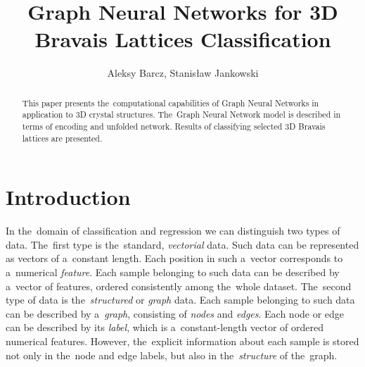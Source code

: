 \documentclass{llncs}
\title{Graph Neural Networks for 3D Bravais Lattices Classification}
\author{Aleksy Barcz, Stanis{\l}aw Jankowski}
\institute{Institute of Electronic Systems, Warsaw University of Technology, Warsaw, Poland}
\begin{document}
\maketitle
%
\begin{abstract}
This paper presents the~computational capabilities of Graph Neural Networks in application to 3D crystal structures. The~Graph Neural Network model is described in terms of encoding and unfolded network. Results of classifying selected 3D Bravais lattices are presented.
\end{abstract}

\section{Introduction}
In the~domain of classification and regression we can distinguish two types of data. The~first type is the~standard, \emph{vectorial} data. Such data can be represented as vectors of a~constant length. Each position in such a~vector corresponds to a~numerical \emph{feature}. Each sample belonging to such data can be described by a~vector of features, ordered consistently among the~whole dataset. The~second type of data is the~\emph{structured} or \emph{graph} data. Each sample belonging to such data can be described by a~\emph{graph}, consisting of \emph{nodes} and \emph{edges}. Each node or edge can be described by its \emph{label}, which is a~constant-length vector of ordered numerical features. However, the~explicit information about each sample is stored not only in the~node and edge labels, but also in the~\emph{structure} of the~graph.
\\\\
\end{document}
